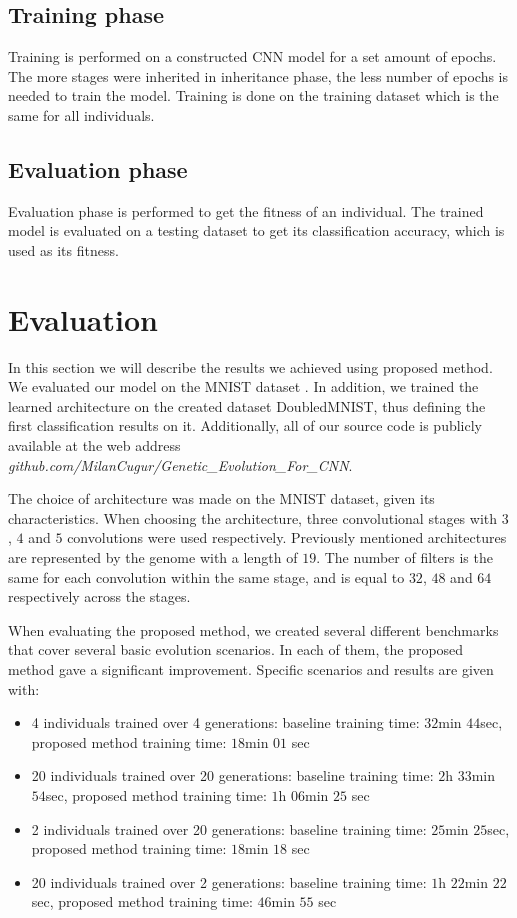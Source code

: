 \documentclass[eng]{simposium}
\begin{document}
\subsection{Training phase}
Training is performed on a constructed CNN model for a set amount of epochs. 
The more stages were inherited in inheritance phase, the less number of epochs is needed to train the model.
Training is done on the training dataset which is the same for all individuals.

\subsection{Evaluation phase}
Evaluation phase is performed to get the fitness of an individual.
The trained model is evaluated on a testing dataset to get its classification accuracy, which is used as its fitness.

\section{Evaluation}

In this section we will describe the results we achieved using proposed method. 
We evaluated our model on the MNIST dataset \cite{8}. In addition, we trained the learned architecture on the 
created dataset DoubledMNIST, thus defining the first classification results on it. 
Additionally, all of our source code is publicly available at the web address \textit{github.com/MilanCugur/Genetic\_Evolution\_For\_CNN}. 

The choice of architecture was made on the MNIST dataset, given its characteristics. 
When choosing the architecture, three convolutional stages with $3$, $4$ and $5$ convolutions were used respectively. 
Previously mentioned architectures are represented by the genome with a length of $19$.
The number of filters is the same for each convolution within the same stage, and is equal to $32$, $48$ and $64$ respectively across the stages. 

When evaluating the proposed method, we created several different benchmarks that cover several basic evolution scenarios. 
In each of them, the proposed method gave a significant improvement. 
Specific scenarios and results are given with:
\begin{itemize}
  \item 4 individuals trained over 4 generations: baseline training time: $32$min $44$sec, proposed method training time: $18$min $01$ sec
  \item 20 individuals trained over 20 generations: baseline training time: $2$h $33$min $54$sec, proposed method training time: $1$h $06$min $25$ sec
  \item 2 individuals trained over 20 generations: baseline training time: $25$min $25$sec, proposed method training time: $18$min $18$ sec
  \item 20 individuals trained over 2 generations: baseline training time: $1$h $22$min $22$sec, proposed method training time: $46$min $55$ sec
\end{itemize}
\end{document}
